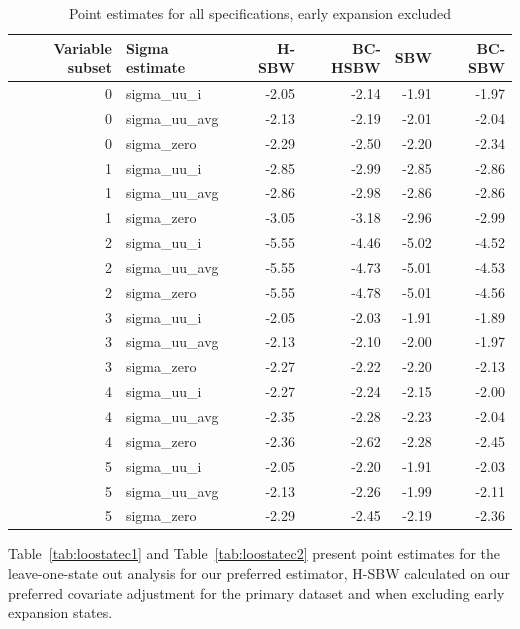 \begin{table}[ht]
\centering
   \caption{Point estimates for all specifications, early expansion excluded}
    \label{tab:secondaryptests}
\begin{tabular}{rlrrrr}
  \hline
Variable subset & Sigma estimate & H-SBW & BC-HSBW & SBW & BC-SBW \\ 
  \hline
0 & sigma\_uu\_i & -2.05 & -2.14 & -1.91 & -1.97 \\ 
  0 & sigma\_uu\_avg & -2.13 & -2.19 & -2.01 & -2.04 \\ 
  0 & sigma\_zero & -2.29 & -2.50 & -2.20 & -2.34 \\ 
  1 & sigma\_uu\_i & -2.85 & -2.99 & -2.85 & -2.86 \\ 
  1 & sigma\_uu\_avg & -2.86 & -2.98 & -2.86 & -2.86 \\ 
  1 & sigma\_zero & -3.05 & -3.18 & -2.96 & -2.99 \\ 
  2 & sigma\_uu\_i & -5.55 & -4.46 & -5.02 & -4.52 \\ 
  2 & sigma\_uu\_avg & -5.55 & -4.73 & -5.01 & -4.53 \\ 
  2 & sigma\_zero & -5.55 & -4.78 & -5.01 & -4.56 \\ 
  3 & sigma\_uu\_i & -2.05 & -2.03 & -1.91 & -1.89 \\ 
  3 & sigma\_uu\_avg & -2.13 & -2.10 & -2.00 & -1.97 \\ 
  3 & sigma\_zero & -2.27 & -2.22 & -2.20 & -2.13 \\ 
  4 & sigma\_uu\_i & -2.27 & -2.24 & -2.15 & -2.00 \\ 
  4 & sigma\_uu\_avg & -2.35 & -2.28 & -2.23 & -2.04 \\ 
  4 & sigma\_zero & -2.36 & -2.62 & -2.28 & -2.45 \\ 
  5 & sigma\_uu\_i & -2.05 & -2.20 & -1.91 & -2.03 \\ 
  5 & sigma\_uu\_avg & -2.13 & -2.26 & -1.99 & -2.11 \\ 
  5 & sigma\_zero & -2.29 & -2.45 & -2.19 & -2.36 \\ 
   \hline
\end{tabular}
\end{table}

Table~\ref{tab:loostatec1} and Table~\ref{tab:loostatec2} present point estimates for the leave-one-state out analysis for our preferred estimator, H-SBW calculated on our preferred covariate adjustment for the primary dataset and when excluding early expansion states.

